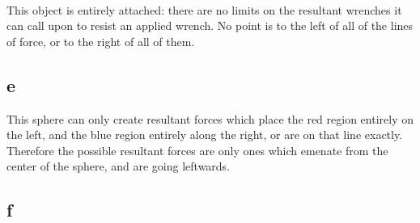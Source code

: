\documentclass{article}
\begin{document}
\paragraph{}
This object is entirely attached: there are no limits on the resultant
	wrenches it can call upon to resist an applied wrench.
No point is to the left of all of the lines of force, or to the right
	of all of them.

\subsection{e}


This sphere can only create resultant forces which place the red 
	region entirely on the left, and the blue region entirely along
	the right, or are on that line exactly.
Therefore the possible resultant forces are only ones which emenate from the
	center of the sphere, and are going leftwards.

\subsection{f}
\end{document}
